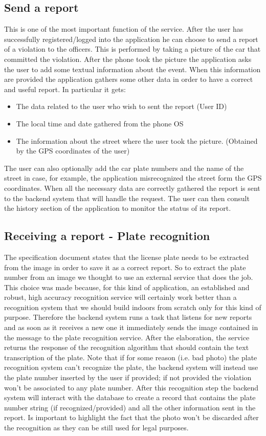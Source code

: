 \subsection{Send a report}
This is one of the most important function of the service. After the user has successfully registered/logged into the application he can choose to send a report of a violation to the officers. This is performed by taking a picture of the car that committed the violation. After the phone took the picture the application asks the user to add some textual information about the event. When this information are provided the application gathers some other data in order to have a correct and useful report. In particular it gets: 
\begin{itemize}
  \item The data related to the user who wish to sent the report (User ID)
  \item The local time and date gathered from the phone OS
  \item The information about the street where the user took the picture. (Obtained by the GPS coordinates of the user)
\end{itemize}

The user can also optionally add the car plate numbers and the name of the street in case, for example, the application misrecognized the street form the GPS coordinates. When all the necessary data are correctly gathered the report is sent to the backend system that will handle the request. The user can then consult the history section of the application to monitor the status of its report.

\subsection{Receiving a report - Plate recognition}
The specification document states that the license plate needs to be extracted from the image in order to save it as a correct report. So to extract the plate number from an image we thought to use an external service that does the job. This choice was made because, for this kind of application, an established and robust, high accuracy recognition service will certainly work better than a recognition system that we should build indoors from scratch only for this kind of purpose. Therefore the backend system runs a task that listens for new reports and as soon as it receives a new one it immediately sends the image contained in the message to the plate recognition service. After the elaboration, the service returns the response of the recognition algorithm that should contain the text transcription of the plate. Note that if for some reason (i.e. bad photo) the plate recognition system can't recognize the plate, the backend system will instead use the plate number inserted by the user if provided; if not provided the violation won't be associated to any plate number. After this recognition step the backend system will interact with the database to create a record that contains the plate number string (if recognized/provided) and all the other information sent in the report. Is important to highlight the fact that the photo won't be discarded after the recognition as they can be still used for legal purposes.

